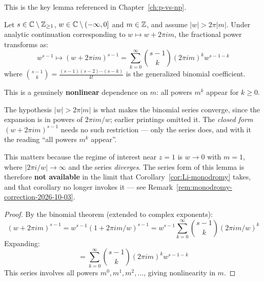 This is the key lemma referenced in Chapter~\ref{ch:p-vs-np}.

\begin{lemma}\label{lem:frac-nonlinear}
Let $s \in \mathbb{C} \setminus \mathbb{Z}_{\geq 1}$, $w \in \mathbb{C} \setminus (-\infty, 0]$ and
$m \in \mathbb{Z}$, and assume $|w| > 2\pi|m|$. Under analytic continuation
corresponding to $w \mapsto w + 2\pi i m$, the fractional power transforms as:
\begin{equation}
w^{s-1} \mapsto (w + 2\pi i m)^{s-1} = \sum_{k=0}^{\infty} \binom{s-1}{k} (2\pi i m)^k w^{s-1-k}
\end{equation}
where $\binom{s-1}{k} = \frac{(s-1)(s-2) \cdots (s-k)}{k!}$ is the generalized binomial coefficient.

This is a genuinely \textbf{nonlinear} dependence on $m$: all powers $m^k$ appear for $k \geq 0$.
\end{lemma}

\begin{remark}
\label{rem:frac-nonlinear-scope-2026-10-03}
The hypothesis $|w| > 2\pi|m|$ is what makes the binomial series converge, since
the expansion is in powers of $2\pi i m/w$; earlier printings omitted it. The
\emph{closed form} $(w + 2\pi i m)^{s-1}$ needs no such restriction --- only the
series does, and with it the reading ``all powers $m^k$ appear''.

This matters because the regime of interest near $z = 1$ is $w \to 0$ with
$m = 1$, where $|2\pi i/w| \to \infty$ and the series \emph{diverges}. The series
form of this lemma is therefore \textbf{not available} in the limit that
Corollary~\ref{cor:Li-monodromy} takes, and that corollary no longer invokes it
--- see Remark~\ref{rem:monodromy-correction-2026-10-03}.
\end{remark}

\begin{proof}
By the binomial theorem (extended to complex exponents):
\begin{equation}
(w + 2\pi i m)^{s-1} = w^{s-1} (1 + 2\pi i m / w)^{s-1} = w^{s-1} \sum_{k=0}^{\infty} \binom{s-1}{k} (2\pi i m / w)^k
\end{equation}
Expanding:
\begin{equation}
= \sum_{k=0}^{\infty} \binom{s-1}{k} (2\pi i m)^k w^{s-1-k}
\end{equation}
This series involves all powers $m^0, m^1, m^2, \ldots$, giving nonlinearity in $m$.
\end{proof}

